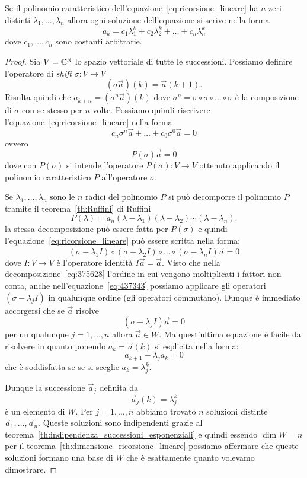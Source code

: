 \begin{theorem}
Se il polinomio caratteristico dell'equazione~\eqref{eq:ricorsione_lineare}
ha $n$ zeri distinti $\lambda_1, \dots, \lambda_n$
allora
ogni soluzione dell'equazione si scrive nella forma
\[
  a_k = c_1 \lambda_1^k + c_2 \lambda_2^k + \dots + c_n \lambda_n^k
\]
dove $c_1, \dots, c_n$ sono costanti arbitrarie.
\end{theorem}
%
\begin{proof}
Sia $V={\mathbb C}^{\mathbb N}$ lo spazio vettoriale di tutte le successioni.
Possiamo definire l'operatore di \emph{shift} $\sigma\colon V\to V$
\[
  (\sigma \vec a)(k) = \vec a(k+1).
\]
Risulta quindi che $a_{k+n} = (\sigma^n \vec a)(k)$ dove
$\sigma^n = \sigma \circ \sigma \circ \dots \circ \sigma$
è la composizione di $\sigma$ con se stesso per $n$ volte.
Possiamo quindi riscrivere l'equazione~\eqref{eq:ricorsione_lineare} nella forma
\[
  c_n \sigma^n \vec a + \dots + c_0 \sigma^0 \vec a = 0
\]
ovvero
\[
  P(\sigma)\vec a = 0
\]
dove con $P(\sigma)$ si intende l'operatore $P(\sigma)\colon V\to V$
ottenuto applicando il polinomio caratteristico $P$ all'operatore $\sigma$.

Se $\lambda_1,\dots,\lambda_n$ sono le $n$ radici del polinomio $P$ si può
decomporre il polinomio $P$ tramite il teorema~\ref{th:Ruffini} di Ruffini
\begin{equation}\label{eq:375628}
  P(\lambda)
  = a_n (\lambda -\lambda_1)(\lambda- \lambda_2)\cdots (\lambda - \lambda_n).
\end{equation}
la stessa decomposizione può essere fatta per $P(\sigma)$
e quindi l'equazione~\eqref{eq:ricorsione_lineare}
può essere scritta nella forma:
\begin{equation}\label{eq:437343}
(\sigma - \lambda_1 I)\circ (\sigma-\lambda_2 I)\circ \dots \circ (\sigma -\lambda_n I) \vec a = 0
\end{equation}
dove $I\colon V\to V$ è l'operatore identità $I\vec a = \vec a$.
Visto che nella decomposizione~\eqref{eq:375628}
l'ordine in cui vengono moltiplicati i fattori non conta,
anche nell'equazione~\eqref{eq:437343} possiamo applicare gli operatori
$(\sigma -\lambda_j I)$ in qualunque ordine (gli operatori commutano).
Dunque è immediato accorgersi che se $\vec a$ risolve
\[
  (\sigma - \lambda_j I) \vec a = 0
\]
per un qualunque $j=1,\dots, n$ allora $\vec a\in W$.
Ma quest'ultima equazione è facile da risolvere in quanto
ponendo $a_k = \vec a(k)$ si esplicita nella forma:
\[
  a_{k+1} - \lambda_j a_k = 0
\]
che è soddisfatta se
se si sceglie $a_k = \lambda_j^k$.

Dunque la successione $\vec a_j$ definita da
\[
  \vec a_j(k) = \lambda_j^k
\]
è un elemento di $W$.
Per $j=1,\dots, n$ abbiamo trovato $n$ soluzioni distinte
$\vec a_1, \dots, \vec a_n$. Queste soluzioni sono
indipendenti grazie al teorema~\ref{th:indipendenza_successioni_esponenziali}
e quindi essendo $\dim W = n$ per il teorema~\ref{th:dimensione_ricorsione_lineare}
possiamo affermare che queste soluzioni formano una base di $W$
che è esattamente quanto volevamo dimostrare.
\end{proof}

